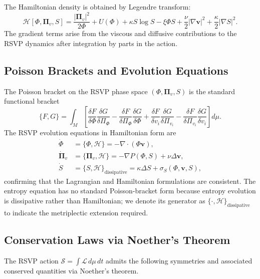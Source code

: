 \documentclass[11pt, oneside]{article}
\numberwithin{equation}{section}
\theoremstyle{rsvpstyle}
\theoremstyle{remark}
\newcommand{\vfield}{\mathbf{v}}
\newcommand{\grad}{\nabla}
\begin{document}
The Hamiltonian density is obtained by Legendre transform:
\begin{equation}
  \mathcal{H}[\Phi, \boldsymbol{\Pi}_v, S] = \frac{|\boldsymbol{\Pi}_v|^2}{2\Phi}
  + U(\Phi) + \kappa S \log S - \xi \Phi S + \frac{\nu}{2}|\grad \vfield|^2
  + \frac{\kappa}{2}|\grad S|^2.
\end{equation}
The gradient terms arise from the viscous and diffusive contributions to the RSVP
dynamics after integration by parts in the action.

\subsection{Poisson Brackets and Evolution Equations}

The Poisson bracket on the RSVP phase space $(\Phi, \boldsymbol{\Pi}_v, S)$ is the
standard functional bracket
\begin{equation}
  \{F, G\} = \int_M \left[
    \frac{\delta F}{\delta \Phi} \frac{\delta G}{\delta \Pi_\Phi}
    - \frac{\delta F}{\delta \Pi_\Phi} \frac{\delta G}{\delta \Phi}
    + \frac{\delta F}{\delta v_i} \frac{\delta G}{\delta \Pi_{v_i}}
    - \frac{\delta F}{\delta \Pi_{v_i}} \frac{\delta G}{\delta v_i}
  \right] d\mu.
\end{equation}
The RSVP evolution equations in Hamiltonian form are
\begin{align}
  \dot\Phi &= \{\Phi, \mathcal{H}\} = -\grad \cdot (\Phi \vfield), \\
  \dot{\boldsymbol{\Pi}}_v &= \{\boldsymbol{\Pi}_v, \mathcal{H}\}
  = -\grad P(\Phi, S) + \nu \Delta \vfield, \\
  \dot S &= \{S, \mathcal{H}\}_\text{dissipative} = \kappa \Delta S
  + \sigma_S(\Phi, \vfield, S),
\end{align}
confirming that the Lagrangian and Hamiltonian formulations are consistent. The
entropy equation has no standard Poisson-bracket form because entropy evolution is
dissipative rather than Hamiltonian; we denote its generator as $\{\cdot,\mathcal{H}\}_\text{dissipative}$
to indicate the metriplectic extension required.

\subsection{Conservation Laws via Noether's Theorem}

The RSVP action $\mathcal{S} = \int \mathcal{L} \,d\mu\,dt$ admits the following
symmetries and associated conserved quantities via Noether's theorem.
\end{document}
